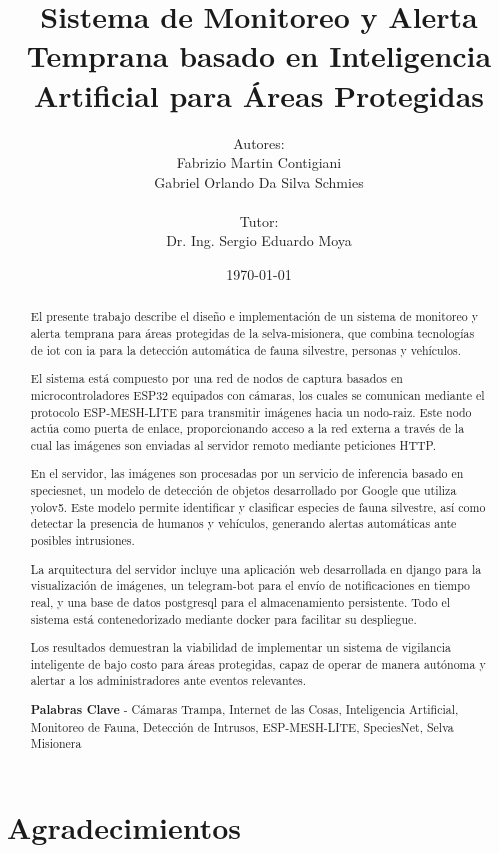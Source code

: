 \documentclass[a4paper, 12pt]{report}
\title{Sistema de Monitoreo y Alerta Temprana basado en Inteligencia Artificial
para Áreas Protegidas}
\author{Autores:\\Fabrizio Martin Contigiani\\Gabriel Orlando Da
Silva Schmies \\\\Tutor:\\Dr. Ing. Sergio Eduardo Moya}
\date{\today}
\begin{document}

\pagestyle{fancy}

\begin{abstract}
  \hspace{1.5em}El presente trabajo describe el diseño e implementación de un sistema
  de monitoreo y alerta temprana para áreas protegidas de la
  \gls{selva-misionera}, que combina tecnologías de \gls{iot} con \gls{ia}
  para la detección automática de fauna silvestre, personas y vehículos.

  El sistema está compuesto por una red de \glspl{nodo} de captura basados en
  microcontroladores \gls{ESP32} equipados con cámaras, los cuales se comunican
  mediante el protocolo \gls{ESP-MESH-LITE} para transmitir imágenes hacia un
  \gls{nodo-raiz}. Este nodo actúa como puerta de enlace, proporcionando acceso
  a la red externa a través de la cual las imágenes son enviadas al servidor
  remoto mediante peticiones HTTP.

  En el servidor, las imágenes son procesadas por un servicio de
  \gls{inferencia} basado en \gls{speciesnet}, un modelo de detección de objetos
  desarrollado por Google que utiliza \gls{yolov5}. Este modelo permite
  identificar y clasificar especies de fauna silvestre, así como detectar
  la presencia de humanos y vehículos, generando alertas automáticas
  ante posibles intrusiones.

  La arquitectura del servidor incluye una aplicación web desarrollada
  en \gls{django} para la visualización de imágenes, un \gls{telegram-bot} para el
  envío de notificaciones en tiempo real, y una base de datos \gls{postgresql}
  para el almacenamiento persistente. Todo el sistema está
  contenedorizado mediante \gls{docker} para facilitar su despliegue.

  Los resultados demuestran la viabilidad de implementar un sistema de
  vigilancia inteligente de bajo costo para áreas protegidas, capaz de
  operar de manera autónoma y alertar a los administradores ante
  eventos relevantes.

  \vspace{2em}
  \noindent\textbf{Palabras Clave} - Cámaras Trampa, Internet de las Cosas,
  Inteligencia Artificial, Monitoreo de Fauna, Detección de Intrusos,
  ESP-MESH-LITE, SpeciesNet, Selva Misionera
\end{abstract}

\chapter*{Agradecimientos}
\end{document}
